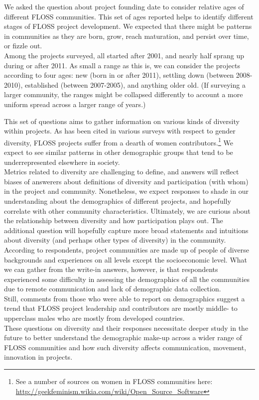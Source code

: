 We asked the question about project founding date to consider relative ages of different FLOSS communities. This set of ages reported helps to identify different stages of FLOSS project development. We expected that there might be patterns in communities as they are born, grow, reach maturation, and persist over time, or fizzle out. \\

\noindent Among the projects surveyed, all started after 2001, and nearly half sprang up during or after 2011. As small a range as this is, we can consider the projects according to four ages: new (born in or after 2011), settling down (between 2008-2010), established (between 2007-2005), and anything older old. (If surveying a larger community, the ranges might be collapsed differently to account a more uniform spread across a larger range of years.)

This set of questions aims to gather information on various kinds of diversity within projects. As has been cited in various surveys with respect to gender diversity, FLOSS projects suffer from a dearth of women contributors.\footnote{See a number of sources on women in FLOSS communities here: \url{http://geekfeminism.wikia.com/wiki/Open_Source_Software}} We expect to see similar patterns in other demographic groups that tend to be underrepresented elsewhere in society.\\

\noindent Metrics related to diversity are challenging to define, and answers will reflect biases of answerers about definitions of diversity and participation (with whom) in the project and community. Nonetheless, we expect responses to shade in our understanding about the demographics of different projects, and hopefully correlate with other community characteristics. Ultimately, we are curious about the relationship between diversity and how participation plays out. The additional question will hopefully capture more broad statements and intuitions about diversity (and perhaps other types of diversity) in the community.\\

\noindent According to respondents, project communities are made up of people of diverse backgrounds and experiences on all levels except the socioeconomic level. What we can gather from the write-in answers, however, is that respondents experienced some difficulty in assessing the demographics of all the communities due to remote communication and lack of demographic data collection. \\

\noindent Still, comments from those who were able to report on demographics suggest a trend that FLOSS project leadership and contributors are mostly middle- to upperclass males who are mostly from developed countries. \\

\noindent These questions on diversity and their responses necessitate deeper study in the future to better understand the demographic make-up across a wider range of FLOSS communities and how such diversity affects communication, movement, innovation in projects. 



